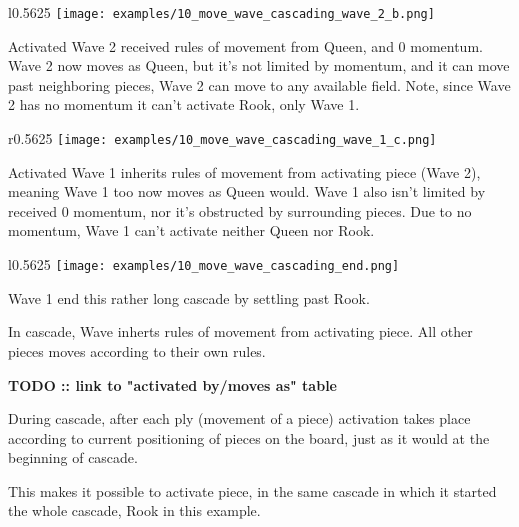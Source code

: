 \clearpage %

\noindent
\begin{wrapfigure}[13]{l}{0.5625\textwidth}
\texttt{[image: examples/10\_move\_wave\_cascading\_wave\_2\_b.png]}
\caption{Wave 2, 2nd cascading}
\label{fig:10_move_wave_cascading_wave_2_b}
\end{wrapfigure}
Activated Wave 2 received rules of movement from Queen, and 0 momentum.
Wave 2 now moves as Queen, but it's not limited by momentum, and it can
move past neighboring pieces, Wave 2 can move to any available field.
Note, since Wave 2 has no momentum it can't activate Rook, only Wave 1.

\vspace*{0.075\textheight}
\noindent
\begin{wrapfigure}[13]{r}{0.5625\textwidth}
\texttt{[image: examples/10\_move\_wave\_cascading\_wave\_1\_c.png]}
\caption{Wave 1, 3rd cascading}
\label{fig:10_move_wave_cascading_wave_1_c}
\end{wrapfigure}
Activated Wave 1 inherits rules of movement from activating piece (Wave 2),
meaning Wave 1 too now moves as Queen would. Wave 1 also isn't limited by
received 0 momentum, nor it's obstructed by surrounding pieces. Due to no
momentum, Wave 1 can't activate neither Queen nor Rook.

\clearpage %

\noindent
\begin{wrapfigure}[14]{l}{0.5625\textwidth}
\texttt{[image: examples/10\_move\_wave\_cascading\_end.png]}
\caption{Wave 1, end cascading}
\label{fig:10_move_wave_cascading_end}
\end{wrapfigure}
Wave 1 end this rather long cascade by settling past Rook.

In cascade, Wave inherts rules of movement from activating piece. All other
pieces moves according to their own rules.

\textbf{\huge{TODO :: link to "activated by/moves as" table}} %

During cascade, after each ply (movement of a piece) activation takes place
according to current positioning of pieces on the board, just as it would
at the beginning of cascade.

This makes it possible to activate piece, in the same cascade in which it
started the whole cascade, Rook in this example.

